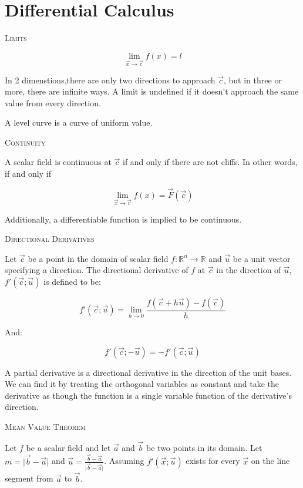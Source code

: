 \documentclass{article}
\begin{document}
\bigskip

\section{Differential Calculus}

\textsc{Limits}

\[
\lim_{\vec{x} \to \vec{c}} f(x) = l
\]

In 2 dimenstions,there are only two directions to approach $\vec{c}$, but in three or more, there are infinite ways.  A limit is undefined if it doesn't approach the same value from every direction.

\smallskip

A level curve is a curve of uniform value.

\bigskip

\textsc{Continuity}

A scalar field is continuous at $\vec{c}$ if and only if there are not cliffs.  In other words, if and only if

\[
\lim_{\vec{x} \to \vec{c}} f(x) = \vec{F}(\vec{c})
\]

Additionally, a differentiable function is implied to be continuous.

\bigskip

\textsc{Directional Derivatives}

Let $\vec{c}$ be a point in the domain of scalar field $f: \mathbb{R}^n \to \mathbb{R}$ and $\vec{u}$ be a unit vector specifying a direction.  The directional derivative of $f$ at $\vec{c}$ in the direction of $\vec{u}$, $f'(\vec{c}; \vec{u})$ is defined to be:

\[
f'(\vec{c}; \vec{u}) = \lim_{h \to 0} \frac{f(\vec{c} + h\vec{u}) - f(\vec{c})}{h}
\]

And:

\[
f'(\vec{c}; -\vec{u}) = -f'(\vec{c}; \vec{u})
\]

A partial derivative is a directional derivative in the direction of the unit bases.  We can find it by treating the orthogonal variables as constant and take the derivative as though the function is a single variable function of the derivative's direction.

\bigskip

\textsc{Mean Value Theorem}

Let $f$ be a scalar field and let $\vec{a}$ and $\vec{b}$ be two points in its domain.  Let $m = \lvert \vec{b} - \vec{a} \rvert$ and $\vec{u} = \frac{\vec{b} - \vec{a}}{\lvert \vec{b} - \vec{a} \rvert}$.  Assuming $f'(\vec{x}; \vec{u})$ exists for every $\vec{x}$ on the line segment from $\vec{a}$ to $\vec{b}$. 
\end{document}
